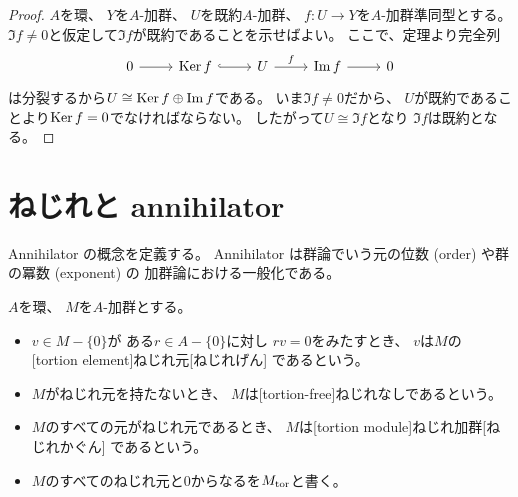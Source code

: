 \documentclass[report]{jlreq}
\begin{document}
\begin{proof}
    $A$を環、
    $Y$を$A$-加群、
    $U$を既約$A$-加群、
    $f \colon U \to Y$を$A$-加群準同型とする。
    $\Im f \neq 0$と仮定して$\Im f$が既約であることを示せばよい。
    ここで、定理より完全列
    \begin{equation}
        \begin{tikzcd}
            0
                \ar{r}
                & \Ker f
                    \ar[hook]{r}
                & U
                    \ar{r}{f}
                & \Im f
                    \ar{r}
                & 0
        \end{tikzcd}
    \end{equation}
    は分裂するから$U \cong \operatorname{\mathrm{Ker}} f \oplus \operatorname{\mathrm{Im}} f$である。
    いま$\Im f \neq 0$だから、
    $U$が既約であることより$\operatorname{\mathrm{Ker}} f = 0$でなければならない。
    したがって$U \cong \Im f$となり
    $\Im f$は既約となる。
\end{proof}



%
\section{ねじれと annihilator}

Annihilator の概念を定義する。
Annihilator は群論でいう元の位数 (order) や群の冪数 (exponent) の
加群論における一般化である。

\begin{definition}[ねじれ]
    $A$を環、
    $M$を$A$-加群とする。
    \begin{itemize}
        \item $v \in M - \{ 0 \}$が
            ある$r \in A - \{ 0 \}$に対し
            $rv = 0$をみたすとき、
            $v$は$M$の
            [tortion element]{ねじれ元}[ねじれげん]
            であるという。
        \item $M$がねじれ元を持たないとき、
            $M$は[tortion-free]{ねじれなし}であるという。
        \item $M$のすべての元がねじれ元であるとき、
            $M$は[tortion module]{ねじれ加群}[ねじれかぐん]
            であるという。
        \item $M$のすべてのねじれ元と$0$からなるを$M_{\mathrm{tor}}$と書く。
    \end{itemize}
\end{definition}
\end{document}
